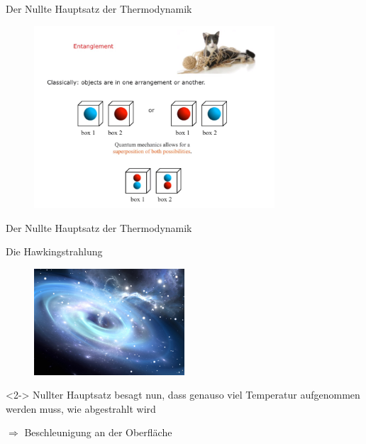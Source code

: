 \documentclass[ngerman,ph]{URbeamer}
\begin{document}
	\begin{frame}{Der Nullte Hauptsatz der Thermodynamik}	
		\begin{figure} [h] 
			\begin{center}
				\includegraphics[width=0.8\textwidth]{entanglement}
			\end{center}
		\end{figure} 	%
	\end{frame}
	\begin{frame}{Der Nullte Hauptsatz der Thermodynamik}
		\begin{center}
			\Large{Die Hawkingstrahlung} 
		\end{center}
		\begin{figure} [h] 
			\begin{center}
				\includegraphics[width=0.5\textwidth]{Hawkingstrahlung}
			\end{center}
		\end{figure} %
		\begin{block}{}<2->
			Nullter Hauptsatz besagt nun, dass genauso viel Temperatur aufgenommen werden muss, wie abgestrahlt wird 
		
			$\Rightarrow$ Beschleunigung an der Oberfläche	
		\end{block}
	\end{frame}
	
\end{document}
